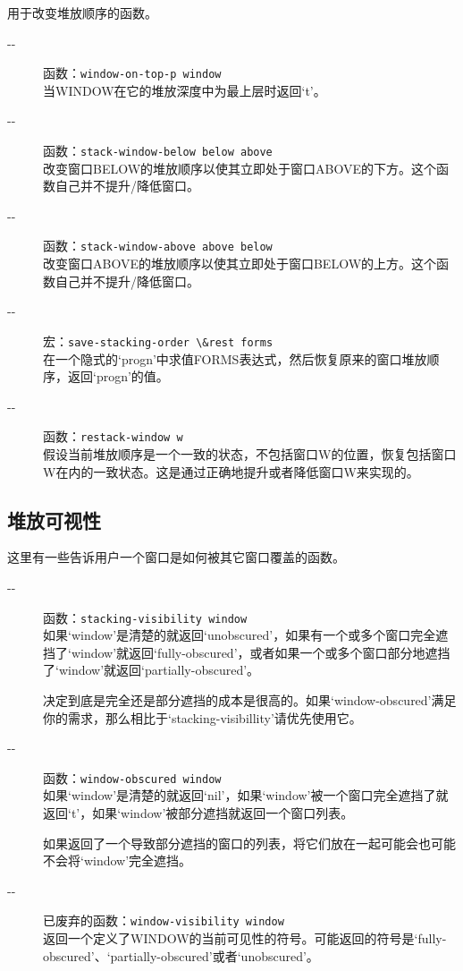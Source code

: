\documentclass{book}
\begin{document}
\begin{CJK*}{UTF8}{gbsn}
用于改变堆放顺序的函数。
\begin{description}
\item[-{}-] 函数：\verb|window-on-top-p window|\\
当WINDOW在它的堆放深度中为最上层时返回`t'。
\item[-{}-] 函数：\verb|stack-window-below below above|\\
改变窗口BELOW的堆放顺序以使其立即处于窗口ABOVE的下方。这个函数自己并不提升/降低窗口。
\item[-{}-] 函数：\verb|stack-window-above above below|\\
改变窗口ABOVE的堆放顺序以使其立即处于窗口BELOW的上方。这个函数自己并不提升/降低窗口。
\item[-{}-] 宏：\verb|save-stacking-order \&rest forms|\\
在一个隐式的`progn'中求值FORMS表达式，然后恢复原来的窗口堆放顺序，返回`progn'的值。
\item[-{}-] 函数：\verb|restack-window w|\\
假设当前堆放顺序是一个一致的状态，不包括窗口W的位置，恢复包括窗口W在内的一致状态。这是通过正确地提升或者降低窗口W来实现的。
\end{description}
\subsection{堆放可视性}
这里有一些告诉用户一个窗口是如何被其它窗口覆盖的函数。
\begin{description}
\item[-{}-] 函数：\verb|stacking-visibility window|\\
如果`window'是清楚的就返回`unobscured'，如果有一个或多个窗口完全遮挡了`window'就返回`fully-obscured'，或者如果一个或多个窗口部分地遮挡了`window'就返回`partially-obscured'。

决定到底是完全还是部分遮挡的成本是很高的。如果`window-obscured'满足你的需求，那么相比于`stacking-visibillity'请优先使用它。
\item[-{}-] 函数：\verb|window-obscured window|\\
如果`window'是清楚的就返回`nil'，如果`window'被一个窗口完全遮挡了就返回`t'，如果`window'被部分遮挡就返回一个窗口列表。

如果返回了一个导致部分遮挡的窗口的列表，将它们放在一起可能会也可能不会将`window'完全遮挡。
\item[-{}-] 已废弃的函数：\verb|window-visibility window|\\
返回一个定义了WINDOW的当前可见性的符号。可能返回的符号是`fully-obscured'、`partially-obscured'或者`unobscured'。


\end{description}
\end{CJK*}
\end{document}
